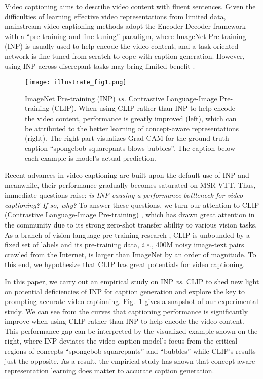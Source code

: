 \documentclass[runningheads]{llncs}
\newcommand\vs{\textit{vs.}}
\newcommand\ie{\textit{i.e.}}
\begin{document}
Video captioning aims to describe video content with fluent sentences. Given the difficulties of learning effective video representations from limited data\cite{xu2016msr,wang2019vatex}, mainstream video captioning methods adopt the Encoder-Decoder framework \cite{venugopalan2015translating} with a ``pre-training and fine-tuning'' paradigm, where ImageNet Pre-training (INP) is usually used to help encode the video content, and a task-oriented network is fine-tuned from scratch to cope with caption generation. 
However, using INP across discrepant tasks may bring limited benefit \cite{he2019rethinking}.


\begin{figure}[t]
\centering
\texttt{[image: illustrate\_fig1.png]}
\caption{ImageNet Pre-training (INP) \vs{} Contrastive Language-Image Pre-training (CLIP). When using CLIP rather than INP to help encode the video content, performance is greatly improved (left), which can be attributed to the better learning of concept-aware representations (right). The right part visualizes Grad-CAM \cite{selvaraju2017grad} for the ground-truth caption ``spongebob squarepants blows bubbles''. The caption below each example is model's actual prediction.
\setlength{\belowcaptionskip}{100pt}
}
\label{fig:INP_vs_VLP}
\end{figure}



Recent advances in video captioning \cite{chen2021motion,lin2021augmented,zhang2021open,zhang2020object,yang2021visual,liu2021o2na,li2022adaptive} are built upon the default use of INP and meanwhile, their performance gradually becomes saturated on MSR-VTT\cite{xu2016msr}. 
Thus, immediate questions raise: \textit{is INP causing a performance bottleneck for video captioning? If so, why?} To answer these questions, we turn our attention to CLIP (Contrastive Language-Image Pre-training) \cite{DBLP:conf/icml/RadfordKHRGASAM21}, which has drawn great attention in the community due to its strong zero-shot transfer ability to various vision tasks. 
As a branch of vision-language pre-training research \cite{sun2019videobert,li2020hero}, CLIP is unbounded by a fixed set of labels and its pre-training data, \ie{}, 400M noisy image-text pairs crawled from the Internet, is larger than ImageNet by an order of magnitude. 
To this end, we hypothesize that CLIP has great potentials for video captioning.


In this paper, we carry out an empirical study on INP \vs{} CLIP to shed new light on potential deficiencies of INP for caption generation and explore the key to prompting accurate video captioning. Fig.~\ref{fig:INP_vs_VLP} gives a snapshot of our experimental study. 
We can see from the curves that captioning performance is significantly improve when using CLIP rather than INP to help encode the video content. 
This performance gap can be interpreted by the visualized example shown on the right, where INP deviates the video caption model's focus from the critical regions of concepts ``spongebob squarepants'' and ``bubbles'' while CLIP's results just the opposite. 
As a result, the empirical study has shown that concept-aware representation learning does matter to accurate caption generation.
\end{document}
